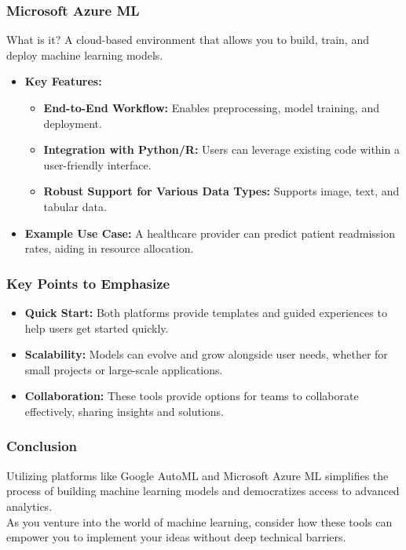 \documentclass[aspectratio=169]{beamer}
\begin{document}
\begin{frame}
    \frametitle{Microsoft Azure ML}
    \begin{block}{What is it?}
        A cloud-based environment that allows you to build, train, and deploy machine learning models.
    \end{block}
    \begin{itemize}
        \item \textbf{Key Features:}
        \begin{itemize}
            \item \textbf{End-to-End Workflow:} Enables preprocessing, model training, and deployment.
            \item \textbf{Integration with Python/R:} Users can leverage existing code within a user-friendly interface.
            \item \textbf{Robust Support for Various Data Types:} Supports image, text, and tabular data.
        \end{itemize}
        \item \textbf{Example Use Case:} A healthcare provider can predict patient readmission rates, aiding in resource allocation.
    \end{itemize}
\end{frame}

\begin{frame}
    \frametitle{Key Points to Emphasize}
    \begin{itemize}
        \item \textbf{Quick Start:} Both platforms provide templates and guided experiences to help users get started quickly.
        \item \textbf{Scalability:} Models can evolve and grow alongside user needs, whether for small projects or large-scale applications.
        \item \textbf{Collaboration:} These tools provide options for teams to collaborate effectively, sharing insights and solutions.
    \end{itemize}
\end{frame}

\begin{frame}
    \frametitle{Conclusion}
    Utilizing platforms like Google AutoML and Microsoft Azure ML simplifies the process of building machine learning models and democratizes access to advanced analytics. 
    \\[0.3cm]
    As you venture into the world of machine learning, consider how these tools can empower you to implement your ideas without deep technical barriers.
\end{frame}
\end{document}
